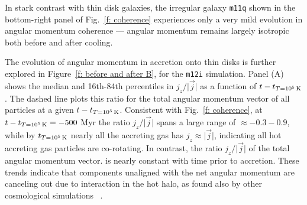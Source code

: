 \documentclass[fleqn,usenatbib]{mnras}
\newcommand{\tcon}{t_{T=10^5\,{\rm K}}}
\begin{document}
In stark contrast with thin disk galaxies, the irregular galaxy \texttt{m11q} shown in the bottom-right panel of Fig.~\ref{f: coherence} experiences only a very mild evolution in angular momentum coherence --- angular momentum remains largely isotropic both before and after cooling.




The evolution of angular momentum in accretion onto thin disks is further explored in Figure~\ref{f: before and after B}, for the \texttt{m12i} simulation. Panel (A) shows the median and 16th-84th percentiles in $j_z/\vert\vec j\vert$ as a function of $t-\tcon$. The dashed line plots this ratio for the total angular momentum vector of all particles at a given $t-\tcon$. 
Consistent with Fig.~\ref{f: coherence}, at $t-\tcon=-500$ Myr the ratio $j_z/\vert\vec j\vert$ spans a large range of $\approx -0.3 - 0.9$, while by $\tcon$ nearly all the accreting gas has $j_z\approx\vert\vec j\vert$, indicating all hot accreting gas particles are co-rotating. In contrast, the ratio $j_z/\vert\vec j\vert$ of the total angular momentum vector.  is nearly constant with time prior to accretion. 
These trends indicate that components unaligned with the net angular momentum are canceling out due to interaction in the hot halo, as found also by other cosmological simulations ~\citep[e.g.][]{DeFelippis2017}.
\end{document}

